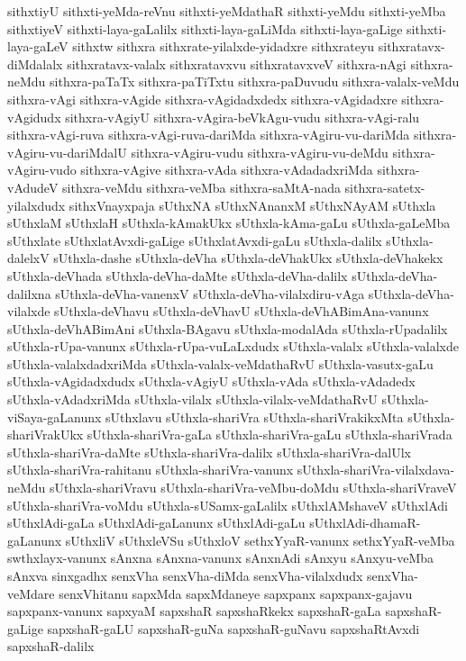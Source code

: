 {sithxtiyU
sithxti-yeMda-reVnu
sithxti-yeMdathaR
sithxti-yeMdu
sithxti-yeMba
sithxtiyeV
sithxti-laya-gaLalilx
sithxti-laya-gaLiMda
sithxti-laya-gaLige
sithxti-laya-gaLeV
sithxtw
sithxra
sithxrate-yilalxde-yidadxre
sithxrateyu
sithxratavx-diMdalalx
sithxratavx-valalx
sithxratavxvu
sithxratavxveV
sithxra-nAgi
sithxra-neMdu
sithxra-paTaTx
sithxra-paTiTxtu
sithxra-paDuvudu
sithxra-valalx-veMdu
sithxra-vAgi
sithxra-vAgide
sithxra-vAgidadxdedx
sithxra-vAgidadxre
sithxra-vAgidudx
sithxra-vAgiyU
sithxra-vAgira-beVkAgu-vudu
sithxra-vAgi-ralu
sithxra-vAgi-ruva
sithxra-vAgi-ruva-dariMda
sithxra-vAgiru-vu-dariMda
sithxra-vAgiru-vu-dariMdalU
sithxra-vAgiru-vudu
sithxra-vAgiru-vu-deMdu
sithxra-vAgiru-vudo
sithxra-vAgive
sithxra-vAda
sithxra-vAdadadxriMda
sithxra-vAdudeV
sithxra-veMdu
sithxra-veMba
sithxra-saMtA-nada
sithxra-satetx-yilalxdudx
sithxVnayxpaja
sUthxNA
sUthxNAnanxM
sUthxNAyAM
sUthxla
sUthxlaM
sUthxlaH
sUthxla-kAmakUkx
sUthxla-kAma-gaLu
sUthxla-gaLeMba
sUthxlate
sUthxlatAvxdi-gaLige
sUthxlatAvxdi-gaLu
sUthxla-dalilx
sUthxla-dalelxV
sUthxla-dashe
sUthxla-deVha
sUthxla-deVhakUkx
sUthxla-deVhakekx
sUthxla-deVhada
sUthxla-deVha-daMte
sUthxla-deVha-dalilx
sUthxla-deVha-dalilxna
sUthxla-deVha-vanenxV
sUthxla-deVha-vilalxdiru-vAga
sUthxla-deVha-vilalxde
sUthxla-deVhavu
sUthxla-deVhavU
sUthxla-deVhABimAna-vanunx
sUthxla-deVhABimAni
sUthxla-BAgavu
sUthxla-modalAda
sUthxla-rUpadalilx
sUthxla-rUpa-vanunx
sUthxla-rUpa-vuLaLxdudx
sUthxla-valalx
sUthxla-valalxde
sUthxla-valalxdadxriMda
sUthxla-valalx-veMdathaRvU
sUthxla-vasutx-gaLu
sUthxla-vAgidadxdudx
sUthxla-vAgiyU
sUthxla-vAda
sUthxla-vAdadedx
sUthxla-vAdadxriMda
sUthxla-vilalx
sUthxla-vilalx-veMdathaRvU
sUthxla-viSaya-gaLanunx
sUthxlavu
sUthxla-shariVra
sUthxla-shariVrakikxMta
sUthxla-shariVrakUkx
sUthxla-shariVra-gaLa
sUthxla-shariVra-gaLu
sUthxla-shariVrada
sUthxla-shariVra-daMte
sUthxla-shariVra-dalilx
sUthxla-shariVra-dalUlx
sUthxla-shariVra-rahitanu
sUthxla-shariVra-vanunx
sUthxla-shariVra-vilalxdava-neMdu
sUthxla-shariVravu
sUthxla-shariVra-veMbu-doMdu
sUthxla-shariVraveV
sUthxla-shariVra-voMdu
sUthxla-sUSamx-gaLalilx
sUthxlAMshaveV
sUthxlAdi
sUthxlAdi-gaLa
sUthxlAdi-gaLanunx
sUthxlAdi-gaLu
sUthxlAdi-dhamaR-gaLanunx
sUthxliV
sUthxleVSu
sUthxloV
sethxYyaR-vanunx
sethxYyaR-veMba
swthxlayx-vanunx
sAnxna
sAnxna-vanunx
sAnxnAdi
sAnxyu
sAnxyu-veMba
sAnxva
sinxgadhx
senxVha
senxVha-diMda
senxVha-vilalxdudx
senxVha-veMdare
senxVhitanu
sapxMda
sapxMdaneye
sapxpanx
sapxpanx-gajavu
sapxpanx-vanunx
sapxyaM
sapxshaR
sapxshaRkekx
sapxshaR-gaLa
sapxshaR-gaLige
sapxshaR-gaLU
sapxshaR-guNa
sapxshaR-guNavu
sapxshaRtAvxdi
sapxshaR-dalilx
}
